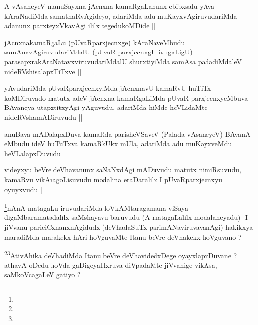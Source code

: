 \begin{artha}
A vAsaneyeV manuSayxna jAcnxna kamaRgaLanunx ebibxsalu yAva
kAraNadiMda samathaRvAgideyo, adariMda adu muKayxvAgiruvudariMda
adanunx parxteyxVkavAgi ililx tegedukoMDide ||
\end{artha}


\begin{artha}
jAcnxnakamaRgaLu (pUvaRparxjecnxge) kAraNaveMbudu
samAnavAgiruvudariMdalU (pUvaR parxjecnxgU ivugaLigU)
parasapxrakAraNatavxviruvudariMdalU shurxtiyiMda samAsa padadiMdaleV
nideRVshisalapxTiTxve ||
\end{artha}

\begin{artha}
yAvudariMda pUvaRparxjecnxyiMda jAcnxnavU kamaRvU huTiTx koMDiruvado
matutx adeV jAcnxna-kamaRgaLiMda pUvaR parxjecnxyeMbuva BAvaneya
utapxtitxyAgi yAguvudu, adariMda hiMde heVLidaMte nideRVshamADiruvudu ||
\end{artha}


\begin{artha}
anuBava mADalapxDuva kamaRda parisheVSaveV (Palada vAsaneyeV) BAvanA
eMbudu ideV huTuTxva kamaRkUkx mUla, adariMda adu muKayxveMdu
heVLalapxDuvudu ||
\end{artha}

\begin{artha}
videyxyu beVre deVhavanunx saNaNxdAgi mADuvudu matutx nimiRsuvudu,
kamaRvu vikAragoLisuvudu  modalina eraDaralilx I pUvaRparxjecnxyu
oyuyxvudu ||
\end{artha}


\begin{artha}
\footnote{}nAnA matagaLu iruvudariMda loVkAMtaragamana viSaya digaMbaramatadalilx
saMshayavu baruvudu  (A matagaLalilx modalaneyadu)- I jiVvanu
pariciCxnanxnAgidudx (deVhadaSuTx parimANaviruvavanAgi) hakikxya
maradiMda marakekx hAri hoVguvaMte Itanu beVre deVhakekx hoVguvano ?
\end{artha}


\begin{artha}
\footnote{}\footnote{}AtivAhika deVhadiMda Itanu beVre deVhavidedxDege
oyayxlapxDuvane ? athavA oDedu hoVda gaDigeyalilxruva diVpadaMte
jiVvanige vikAsa, saMkoVcagaLeV gatiyo ?
\end{artha}

